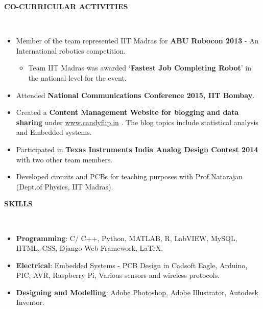 \documentclass[a4paper,10pt]{article}
\newcommand{\lsep}{-0.5cm}
\newcommand{\resheading}[1]{{\small \colorbox{mygrey}{\begin{minipage}{0.975\textwidth}{\textbf{#1 \vphantom{p\^{E}}}}\end{minipage}}}}
\begin{document}
\resheading{\textbf{CO-CURRICULAR ACTIVITIES} }\\[\lsep]
    \begin{itemize}
        \item Member of the team represented IIT Madras for \textbf{ABU Robocon 2013} - An International robotics competition.
        \begin{itemize}
            \vspace{-5pt}
            \item Team IIT Madras was awarded `\textbf{Fastest Job Completing Robot}' in the national level for the event.
            \vspace{-5pt}
        \end{itemize}
        \item Attended \textbf{National Communications Conference 2015, IIT Bombay}.
        \vspace{-5pt}
        \item Created a \textbf{Content Management Website for blogging and data sharing} under \hspace{3pt}\url{www.candyflip.in} . The blog topics include statistical analysis and Embedded systems.
        \vspace{-5pt}
        \item Participated in \textbf{Texas Instruments India Analog Design Contest 2014} with two other team members.
        \vspace{-5pt}       
        \item Developed circuits and PCBs for teaching purposes with Prof.Natarajan (Dept.of Physics, IIT Madras).
    \end{itemize}

\resheading{\textbf{SKILLS} }\\[\lsep]
    \begin{itemize}
        \item \textbf{Programming}: C/ C++, Python, MATLAB, R, LabVIEW, MySQL, HTML, CSS, Django Web Framework, \LaTeX.
        \vspace{-5pt}
        \item \textbf{Electrical}: Embedded Systems - PCB Design in Cadsoft Eagle, Arduino,  PIC, AVR, Raspberry Pi, Various sensors and wireless protocols.
        \vspace{-5pt}
        \item \textbf{Designing and Modelling}: Adobe Photoshop, Adobe Illustrator, Autodesk Inventor.
    \end{itemize}
    
\end{document}
